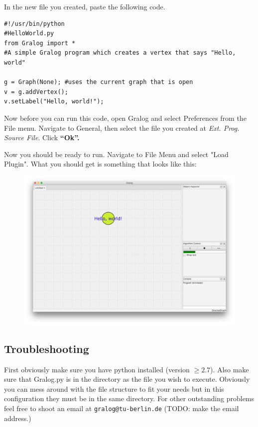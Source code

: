 \documentclass{article}
\begin{document}
In the new file you created, paste the following code.


\begin{lstlisting}[title={Code Snippet 1},label=codeSnippet1]
#!/usr/bin/python
#HelloWorld.py
from Gralog import *
#A simple Gralog program which creates a vertex that says "Hello, world"

g = Graph(None); #uses the current graph that is open
v = g.addVertex();
v.setLabel("Hello, world!");
\end{lstlisting}

Now before you can run this code, open Gralog and select Preferences from the File menu. Navigate to General, then select the file you created at \emph{Ext. Prog. Source File}. Click \textbf{``Ok''.}

Now you should be ready to run. Navigate to File Menu and select "Load Plugin". What you should get is something that looks like this: 

\begin{figure}[H]
\centering
\includegraphics[width=\textwidth]{helloWorld.png}
\end{figure}


\subsection{Troubleshooting}
First obviously make sure you have python installed (version $\ge
2.7$). Also make sure that Gralog.py is in the directory as the file you
wish to execute. Obviously you can mess around with the file structure
to fit your needs but in this configuration they must be in the same
directory. For other outstanding problems feel free to shoot an email
at \texttt{gralog@tu-berlin.de} (TODO: make the email address.)
\end{document}
